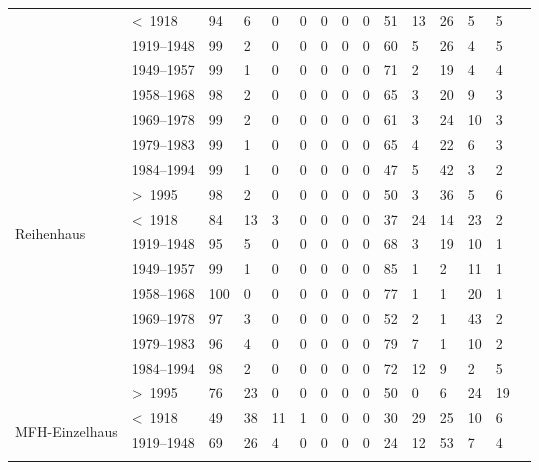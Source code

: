 \begin{longtable}{ll | lllllll | lllll | l}
\begin{tabular}{ll | lllllll | lllll | l}
&\textless~1918     & 94 & 6 & 0 & 0 & 0 & 0 & 0 & 51 & 13 & 26 & 5 & 5 \\ 
&1919--1948  & 99 & 2 & 0 & 0 & 0 & 0 & 0 & 60 & 5 & 26 & 4 & 5 \\ 
&1949--1957  & 99 & 1 & 0 & 0 & 0 & 0 & 0 & 71 & 2 & 19 & 4 & 4 \\ 
&1958--1968  & 98 & 2 & 0 & 0 & 0 & 0 & 0 & 65 & 3 & 20 & 9 & 3 \\ 
&1969--1978  & 99 & 2 & 0 & 0 & 0 & 0 & 0 & 61 & 3 & 24 & 10 & 3 \\ 
&1979--1983  & 99 & 1 & 0 & 0 & 0 & 0 & 0 & 65 & 4 & 22 & 6 & 3 \\ 
&1984--1994  & 99 & 1 & 0 & 0 & 0 & 0 & 0 & 47 & 5 & 42 & 3 & 2 \\ 
&\textgreater~1995     & 98 & 2 & 0 & 0 & 0 & 0 & 0 & 50 & 3 & 36 & 5 & 6 \\ 
\cmidrule{1-14}
\multirow{8}{*}{\begin{sideways} Reihenhaus \end{sideways}}
\multirow{8}{*}{\begin{sideways} Terrace house \end{sideways}}
&\textless~1918     & 84 & 13 & 3 & 0 & 0 & 0 & 0 & 37 & 24 & 14 & 23 & 2 \\ 
&1919--1948  & 95 & 5 & 0 & 0 & 0 & 0 & 0 & 68 & 3 & 19 & 10 & 1 \\ 
&1949--1957  & 99 & 1 & 0 & 0 & 0 & 0 & 0 & 85 & 1 & 2 & 11 & 1 \\ 
&1958--1968  & 100 & 0 & 0 & 0 & 0 & 0 & 0 & 77 & 1 & 1 & 20 & 1 \\ 
&1969--1978  & 97 & 3 & 0 & 0 & 0 & 0 & 0 & 52 & 2 & 1 & 43 & 2 \\ 
&1979--1983  & 96 & 4 & 0 & 0 & 0 & 0 & 0 & 79 & 7 & 1 & 10 & 2 \\ 
&1984--1994  & 98 & 2 & 0 & 0 & 0 & 0 & 0 & 72 & 12 & 9 & 2 & 5 \\ 
&\textgreater~1995     & 76 & 23 & 0 & 0 & 0 & 0 & 0 & 50 & 0 & 6 & 24 & 19 \\ 
\cmidrule{1-14}
\multirow{8}{*}{\begin{sideways} MFH-Einzelhaus \end{sideways}}
\multirow{8}{*}{\begin{sideways} Single family house \end{sideways}}
&\textless~1918     & 49 & 38 & 11 & 1 & 0 & 0 & 0 & 30 & 29 & 25 & 10 & 6 \\ 
&1919--1948  & 69 & 26 & 4 & 0 & 0 & 0 & 0 & 24 & 12 & 53 & 7 & 4 \\ 

\end{tabular}
\end{longtable}
